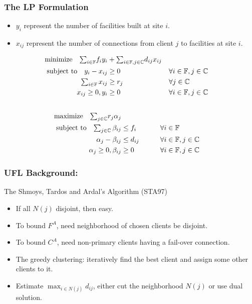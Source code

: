 \documentclass[handout, hyperref, xcolor=dvipsnames]{beamer}
\begin{document}
\begin{frame}
  \frametitle{The LP Formulation}
  \begin{itemize}
  \item $y_i$ represent the number of facilities built at site $i$.
  \item $x_{ij}$ represent the number of connections from client $j$
    to facilities at site $i$.
  \end{itemize}
  \begin{alignat}{3}
    \textrm{minimize}\quad \textstyle{\sum_{i\in \mathbb{F}}}f_iy_i &+ \textstyle{\sum_{i\in \mathbb{F}, j\in \mathbb{C}}}d_{ij}x_{ij}&\label{eqn:fac_primal}
    \\ \notag
    \textrm{subject to}\quad y_i - x_{ij} &\geq 0  & &\forall i\in \mathbb{F}, j\in \mathbb{C} 
    \\ \notag
    \textstyle{\sum_{i\in \mathbb{F}} x_{ij}} &\geq r_j & &\forall j\in \mathbb{C}
    \\ \notag
    x_{ij} \geq 0, y_i &\geq 0 & &\forall i\in \mathbb{F}, j\in \mathbb{C} 
    \\ \notag
  \end{alignat}
  \begin{alignat}{3}
    \textrm{maximize}\quad \textstyle{\sum_{j\in \mathbb{C}}} r_j\alpha_j&\label{eqn:fac_dual}  
    \\ \notag
    \textrm{subject to} \quad \textstyle{
      \sum_{j\in \mathbb{C}}\beta_{ij}} &\leq f_i  &\quad\quad			&\forall i \in \mathbb{F}  
    \\ \notag
    \alpha_{j} - \beta_{ij} 	&\leq  d_{ij}       &                 & \forall i\in \mathbb{F}, j\in \mathbb{C} 
    \\ \notag
    \alpha_j \geq 0, \beta_{ij} &\geq 0           &            & \forall i\in \mathbb{F}, j\in \mathbb{C}
  \end{alignat}
\end{frame}

\begin{frame}
  \frametitle{UFL Background:}

  The Shmoys, Tardos and Ardal's Algorithm (STA97)
  \begin{itemize}
  \item If all $N(j)$ disjoint, then easy.
  \item To bound $F^A$, need neighborhood of chosen clients be disjoint.
  \item To bound $C^A$, need non-primary clients having a fail-over connection.
  \end{itemize}

  \begin{itemize}
  \item The greedy clustering: iteratively find the best client and assign some other clients to it.
  \item Estimate $\max_{i\in N(j)} d_{ij}$, either cut the neighborhood $N(j)$ or use dual solution.
  \end{itemize}
\end{frame}
\end{document}
